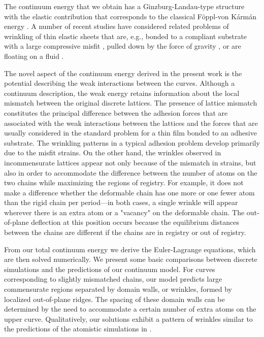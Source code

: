\documentclass{siamltex}
\begin{document}
The continuum energy that we obtain has a Ginzburg-Landau-type
structure with the elastic contribution that corresponds to the
classical F\"oppl-von K\'arm\'an energy \cite{PhysRevE.85.066115}. A
number of recent studies have considered related problems of wrinkling
of thin elastic sheets that are, e.g., bonded to a compliant substrate
with a large compressive misfit \cite{Kohn2013,wang2014phase,PhysRevLett.72.3570}, pulled down by the
force of gravity \cite{CPA:CPA21643}, or are floating on a fluid
\cite{PhysRevLett.107.044301,PhysRevLett.105.038302,CPA:CPA21471}.  

The novel aspect of the continuum energy derived in the present work is the {potential} describing
the weak interactions between the curves.  Although a continuum
description, the weak energy retains information about the {local} mismatch
between the original discrete lattices. {The presence of lattice mismatch constitutes the principal difference between the adhesion forces that are associated with the weak interactions between the lattices and the forces that are usually considered in the standard problem for a thin film bonded to an adhesive substrate. The wrinkling patterns in a typical adhesion problem develop primarily due to the misfit strains. On the other hand, the wrinkles observed in incommensurate lattices appear not only because of the mismatch in strains, but also in order to accommodate the difference between the number of atoms on the two chains while maximizing the regions of registry. For example, it does not make a difference whether the deformable chain has one more or one fewer atom than the rigid chain per period---in both cases, a single wrinkle will appear wherever there is an extra atom or a "vacancy" on the deformable chain. The out-of-plane deflection at this position occurs because the equilibrium distances between the chains are different if the chains are in registry or out of registry.}

From our total continuum energy we derive the Euler-Lagrange
equations, which are then solved numerically.  We present some basic
comparisons between discrete simulations and the predictions of our
continuum model.  {For curves corresponding to slightly mismatched chains}, our model predicts
large commensurate regions separated by domain walls, or wrinkles, formed by
localized out-of-plane ridges.  The spacing of these
domain walls can be determined by the need to accommodate a certain
number of extra atoms on the upper curve.  Qualitatively, our
solutions exhibit a pattern of {wrinkles} similar
to the predictions of the atomistic simulations in
\cite{van2015relaxation}.
\end{document}
